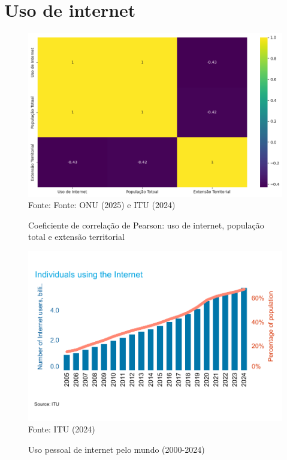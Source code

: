 \section{Uso de internet}

\begin{figure}[ht]
    \centering
    \caption{Coeficiente de correlação de Pearson: uso de internet, população total e extensão territorial}
    \includegraphics[width=1\linewidth]{figuras/internet/correlacao.png}
    \label{fig:intert_correlacao}
    \footnotesize{Fonte: Fonte: ONU (2025) e ITU (2024)}
\end{figure}

\begin{figure}[ht]
    \centering
    \caption{Uso pessoal de internet pelo mundo (2000-2024)}
    \includegraphics[width=1\linewidth]{figuras/internet/individuals_using_internet_itu.png}
    \label{fig:individuals_using_internet_itu}
    \footnotesize{Fonte: ITU (2024)}
\end{figure}

